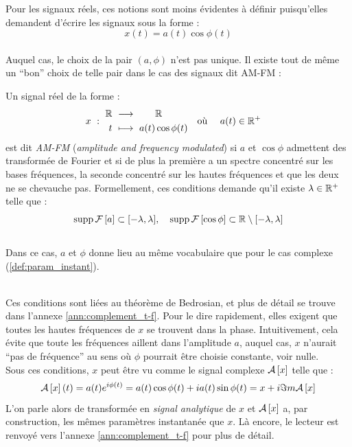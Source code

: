 Pour les signaux réels, ces notions sont moins évidentes à définir puisqu'elles demandent d'écrire les signaux sous la forme :
\[x(t) = a(t) \cos\phi(t)\]
\\
Auquel cas, le choix de la pair $(a,\phi)$ n'est pas unique. Il existe tout de même un ``bon'' choix de telle pair dans le cas des signaux dit AM-FM :
\begin{definition}[Signal AM-FM]
	Un signal réel de la forme :
	\begin{align}
		x\ &:\ \begin{aligned}\mathbb{R}\ &\longrightarrow\qquad \mathbb{R} \\
			t\ &\longmapsto\ a(t) \cos\phi(t)
		\end{aligned}  &  \text{où }\quad a(t)\in\mathbb{R}^+\quad
	\end{align}
	est dit \emph{AM-FM} (\emph{amplitude and frequency modulated}) si $a$ et $\cos\phi$ admettent des transformée de Fourier et si de plus la première a un spectre concentré sur les bases fréquences, la seconde concentré sur les hautes fréquences et que les deux ne se chevauche pas.
	Formellement, ces conditions demande qu'il existe $\lambda\in\mathbb{R}^+$ telle que :
	\begin{equation}\label{eq:condi_AM-FM}
		\text{\normalfont supp}\, \mathcal{F}\left[a\right] \subset [-\lambda, \lambda],\quad \text{\normalfont supp}\, \mathcal{F}\left[\cos\phi\right] \subset \mathbb{R}\setminus[-\lambda,\lambda]
	\end{equation}
	\\
	Dans ce cas, $a$ et $\phi$ donne lieu au même vocabulaire que pour le cas complexe (\cref{def:param_instant}).
\end{definition}
\skipl
\\
Ces conditions sont liées au théorème de Bedrosian, et plus de détail se trouve dans l'annexe \ref{ann:complement_t-f}. Pour le dire rapidement, elles exigent que toutes les hautes fréquences de $x$ se trouvent dans la phase. Intuitivement, cela évite que toute les fréquences aillent dans l'amplitude $a$, auquel cas, $x$ n'aurait ``pas de fréquence'' au sens où $\phi$ pourrait être choisie constante, voir nulle.
\\
Sous ces conditions, $x$ peut être vu comme le signal complexe $\mathcal{A}\left[x\right]$ telle que :
\[\mathcal{A}\left[x\right](t) = a(t) e^{i\phi(t)}= a(t)\cos\phi(t) + ia(t)\sin\phi(t) = x  + i\Im m \mathcal{A}\left[x\right]\]
L'on parle alors de transformée en \emph{signal analytique} de $x$ et $\mathcal{A}\left[x\right]$ a, par construction, les mêmes paramètres instantanée que $x$.
Là encore, le lecteur est renvoyé vers l'annexe \ref{ann:complement_t-f} pour plus de détail.
\\


